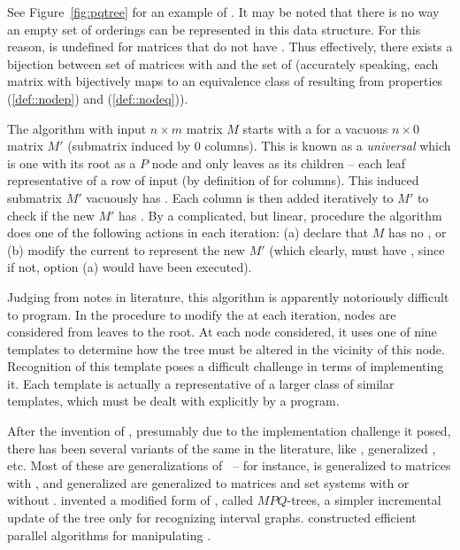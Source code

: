 See Figure~\ref{fig:pqtree} for an example of \PQtree. It may be noted
that there is no way an empty set of \COP orderings can be represented
in this data structure. For this reason, \PQtree is undefined for
matrices that do not have \COP.  Thus effectively, there exists a
bijection between set of matrices with \COP and the set of \PQtrees
(accurately speaking, each matrix with \COP bijectively maps to an
equivalence class of \PQtrees resulting from properties (\ref{def::nodep}) and
(\ref{def::nodeq})).


\figpqtree

The \cite{bl76} algorithm with input $n \times m$ matrix $M$ starts
with a \PQtree for a vacuous $n \times 0$ matrix $M'$ (submatrix
induced by 0 columns). This is known as a {\em universal} \PQtree
which is one with its root as a $P$ node and only leaves as its
children -- each leaf representative of a row of input (by definition
of \COP for columns). This induced submatrix $M'$ vacuously has \COP.
Each column is then added iteratively to $M'$ to check if the new $M'$
has \COP.  By a complicated, but linear, procedure the algorithm does
one of the following actions in each iteration: (a) declare that $M$
has no \COP, or (b) modify the current \PQtree to represent the new
$M'$ (which clearly, must have \COP, since if not, option (a) would
have been executed).


Judging from notes in literature, this algorithm is apparently
notoriously difficult to program. In the procedure to modify the
\PQtree at each iteration, nodes are considered from leaves to
the root. At each node considered, it uses one of nine templates to
determine how the tree must be altered in the vicinity of this
node. Recognition of this template poses a difficult challenge in
terms of implementing it. Each template is actually a representative
of a larger class of similar templates, which must be dealt with
explicitly by a program\cite{mcc04}.


After the invention of \PQtrees, presumably due to the implementation
challenge it posed, there has been several variants of the same in the
literature, like \PCtree \cite{sh99,wlh01,hm03}, generalized \PQtree
\cite{km89,mcc04}, \PQRtree \cite{mm96,mpt98} etc. Most of these are
generalizations of \PQtree\ -- for instance, \PCtree is generalized to
matrices with \CROP, \PQRtree and generalized \PQtree are generalized
to matrices and set systems with or without \COP. \cite{km89} invented
a modified form of \PQtree, called $MPQ$-trees, a simpler incremental
update of the tree only for recognizing interval graphs.  \cite{kr88}
constructed efficient parallel algorithms for manipulating \PQtrees.


